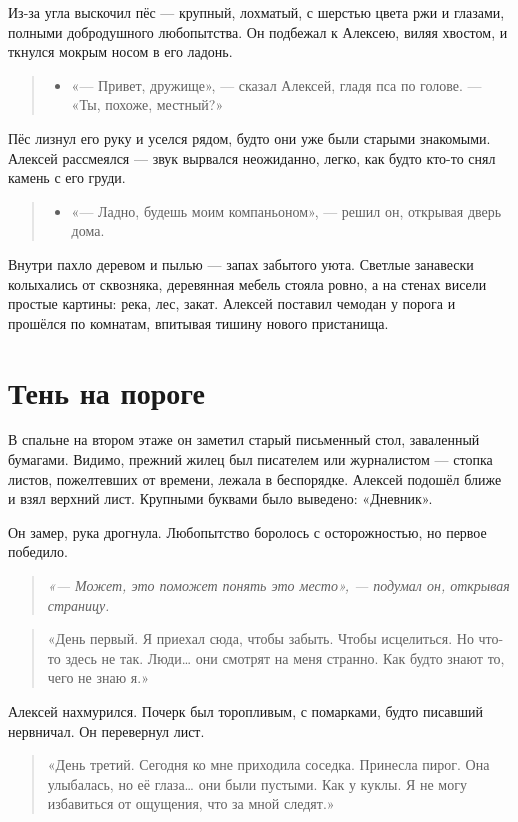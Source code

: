 \documentclass[12pt,a4paper]{book}
\newenvironment{dialogue}{\begin{quote}\itshape\begin{itemize}\item[]}{\end{itemize}\end{quote}}
\newenvironment{innerthought}{\begin{quote}\small\itshape}{\end{quote}}
\begin{document}
Из-за угла выскочил пёс — крупный, лохматый, с шерстью цвета ржи и глазами, полными добродушного любопытства. Он подбежал к Алексею, виляя хвостом, и ткнулся мокрым носом в его ладонь.

\begin{dialogue}
«— Привет, дружище», — сказал Алексей, гладя пса по голове. — «Ты, похоже, местный?»
\end{dialogue}

Пёс лизнул его руку и уселся рядом, будто они уже были старыми знакомыми. Алексей рассмеялся — звук вырвался неожиданно, легко, как будто кто-то снял камень с его груди.

\begin{dialogue}
«— Ладно, будешь моим компаньоном», — решил он, открывая дверь дома.
\end{dialogue}

Внутри пахло деревом и пылью — запах забытого уюта. Светлые занавески колыхались от сквозняка, деревянная мебель стояла ровно, а на стенах висели простые картины: река, лес, закат. Алексей поставил чемодан у порога и прошёлся по комнатам, впитывая тишину нового пристанища.

\section{Тень на пороге}

В спальне на втором этаже он заметил старый письменный стол, заваленный бумагами. Видимо, прежний жилец был писателем или журналистом — стопка листов, пожелтевших от времени, лежала в беспорядке. Алексей подошёл ближе и взял верхний лист. Крупными буквами было выведено: «Дневник».

Он замер, рука дрогнула. Любопытство боролось с осторожностью, но первое победило.

\begin{innerthought}
«— Может, это поможет понять это место», — подумал он, открывая страницу.
\end{innerthought}

\begin{quote}
«День первый. Я приехал сюда, чтобы забыть. Чтобы исцелиться. Но что-то здесь не так. Люди… они смотрят на меня странно. Как будто знают то, чего не знаю я.»
\end{quote}

Алексей нахмурился. Почерк был торопливым, с помарками, будто писавший нервничал. Он перевернул лист.

\begin{quote}
«День третий. Сегодня ко мне приходила соседка. Принесла пирог. Она улыбалась, но её глаза… они были пустыми. Как у куклы. Я не могу избавиться от ощущения, что за мной следят.»
\end{quote}
\end{document}
